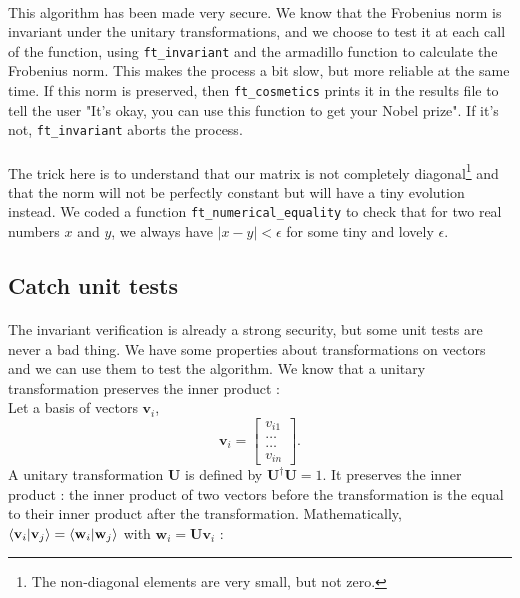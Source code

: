 \documentclass[a4paper, twoside, 11pt]{report}
\theoremstyle{theorem}
\theoremstyle{remark}
\theoremstyle{exemple}
\begin{document}
			\paragraph{}This algorithm has been made very secure. We know that the Frobenius norm is invariant under the unitary transformations, and we choose to test it at each call of the function, using \texttt{ft\_invariant} and the armadillo function to calculate the Frobenius norm. This makes the process a bit slow, but more reliable at the same time. If this norm is preserved, then \texttt{ft\_cosmetics} prints it in the results file to tell the user "It's okay, you can use this function to get your Nobel prize". If it's not, \texttt{ft\_invariant} aborts the process.
			
			\paragraph{}The trick here is to understand that our matrix is not completely diagonal\footnote{The non-diagonal elements are very small, but not zero.} and that the norm will not be perfectly constant but will have a tiny evolution instead. We coded a function \texttt{ft\_numerical\_equality} to check that for two real numbers $x$ and $y$, we always have $\left| x-y \right| < \epsilon$ for some tiny and lovely $\epsilon$. 
    
    	\subsection{Catch unit tests}
	
			\paragraph{}The invariant verification is already a strong security, but some unit tests are never a bad thing. We have some properties about transformations on vectors and we can use them to test the algorithm. We know that a unitary transformation preserves the inner product : \\
			Let a basis of vectors $\mathbf{v}_i$,      			
				\begin{equation*}\mathbf{v}_i = \begin{bmatrix} v_{i1} \\ \dots \\ \dots \\v_{in} \end{bmatrix}.
				\end{equation*} 
		        A unitary transformation $\mathbf{U}$ is defined by $\mathbf{U}^\dag \mathbf{U} = 1$. It preserves the inner product : the inner product of two vectors before the transformation is the equal to their inner product after the transformation. Mathematically, $\braket{\mathbf{v}_i}{\mathbf{v}_j} = \braket{\mathbf{w}_i}{\mathbf{w}_j}$ with $\mathbf{w}_i = \mathbf{U v}_i$ : 
\end{document}
